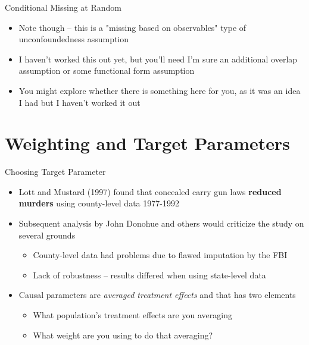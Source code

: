 \documentclass{beamer}
\begin{document}
\begin{frame}{Conditional Missing at Random}

\begin{itemize}
    \item Note though -- this is a "missing based on observables" type of unconfoundedness assumption
    \item I haven't worked this out yet, but you'll need I'm sure an additional overlap assumption or some functional form assumption
    \item You might explore whether there is something here for you, as it was an idea I had but I haven't worked it out

\end{itemize}

\end{frame}



\section{Weighting and Target Parameters}



\begin{frame}{Choosing Target Parameter}

\begin{itemize}
\item Lott and Mustard (1997) found that concealed carry gun laws \textbf{reduced murders} using county-level data 1977-1992
\item Subsequent analysis by John Donohue and others would criticize the study on several grounds
	\begin{itemize}
	\item County-level data had problems due to flawed imputation by the FBI
	\item Lack of robustness -- results differed when using state-level data
	\end{itemize}
\item Causal parameters are \emph{averaged treatment effects} and that has two elements
	\begin{itemize}
	\item What population's treatment effects are you averaging
	\item What weight are you using to do that averaging?
	\end{itemize}
\end{itemize}

\end{frame}
\end{document}
